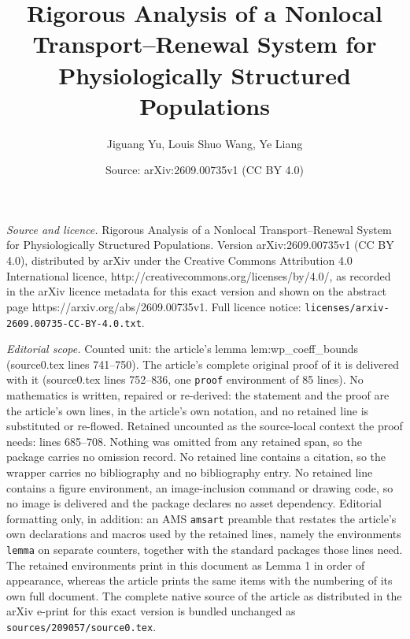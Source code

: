 \documentclass[10pt,a4paper]{amsart}
\title{Rigorous Analysis of a Nonlocal Transport--Renewal System for Physiologically Structured Populations}
\author{Jiguang Yu, Louis Shuo Wang, Ye Liang}
\date{Source: arXiv:2609.00735v1 (CC BY 4.0)}
\begin{document}
\maketitle

\noindent\emph{Source and licence.} Rigorous Analysis of a Nonlocal Transport--Renewal System for Physiologically Structured Populations. Version arXiv:2609.00735v1 (CC BY 4.0), distributed by arXiv under the Creative Commons Attribution 4.0 International licence, http://creativecommons.org/licenses/by/4.0/, as recorded in the arXiv licence metadata for this exact version and shown on the abstract page https://arxiv.org/abs/2609.00735v1. Full licence notice: \texttt{licenses/arxiv-2609.00735-CC-BY-4.0.txt}.\par\smallskip

\noindent\textit{Editorial scope.} Counted unit: the article's lemma lem:wp\_coeff\_bounds (source0.tex lines 741--750). The article's complete original proof of it is delivered with it (source0.tex lines 752--836, one \texttt{proof} environment of 85 lines). No mathematics is written, repaired or re-derived: the statement and the proof are the article's own lines, in the article's own notation, and no retained line is substituted or re-flowed.  Retained uncounted as the source-local context the proof needs: lines 685--708.  Nothing was omitted from any retained span, so the package carries no omission record.  No retained line contains a citation, so the wrapper carries no bibliography and no bibliography entry.  No retained line contains a figure environment, an image-inclusion command or drawing code, so no image is delivered and the package declares no asset dependency.  Editorial formatting only, in addition: an AMS \texttt{amsart} preamble that restates the article's own declarations and macros used by the retained lines, namely the environments \texttt{lemma} on separate counters, together with the standard packages those lines need.  The retained environments print in this document as Lemma 1 in order of appearance, whereas the article prints the same items with the numbering of its own full document.  The complete native source of the article as distributed in the arXiv e-print for this exact version is bundled unchanged as \texttt{sources/209057/source0.tex}.
\end{document}
